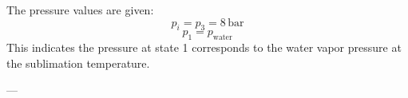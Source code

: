 The pressure values are given:  
\[
p_i = p_3 = 8 \, \text{bar}
\]  
\[
p_1 = p_{\text{water}}
\]  
This indicates the pressure at state 1 corresponds to the water vapor pressure at the sublimation temperature.

---